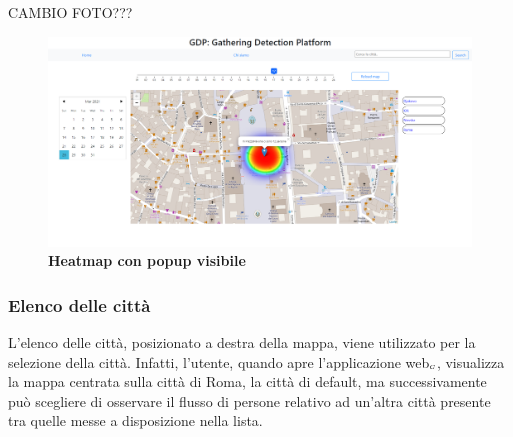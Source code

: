 CAMBIO FOTO???
\begin{center}
	\begin{figure}[H]
		\centering\includegraphics[width=0.9\linewidth]{../immagini/manualeUtente/popup.png}
		\caption{\textbf{\textbf{\textbf{Heatmap con popup visibile}}}}
	\end{figure}
\end{center} 

\subsubsection{Elenco delle città} \label{UtilizzoDiGDPGatheringDetecionPlatformContenutoCentralePaginaInizialeHomeMenùATendina}
L'elenco delle città, posizionato a destra della mappa, viene utilizzato per la selezione della città. Infatti, l'utente, quando apre l'applicazione web$_{\scaleto{G}{3pt}}$, visualizza la mappa centrata sulla città di Roma, la città di default, ma successivamente può scegliere di osservare il flusso di persone relativo ad un'altra città presente tra quelle messe a disposizione nella lista. 



